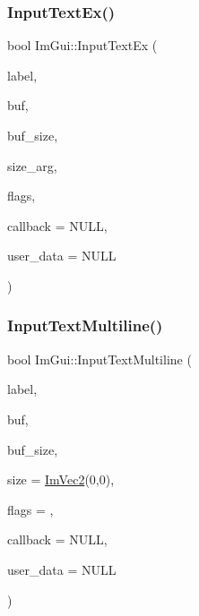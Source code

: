 \subsubsection{\texorpdfstring{Input\+Text\+Ex()}{InputTextEx()}}
{\footnotesize\ttfamily bool Im\+Gui\+::\+Input\+Text\+Ex (\begin{DoxyParamCaption}\item[{const char $\ast$}]{label,  }\item[{char $\ast$}]{buf,  }\item[{int}]{buf\+\_\+size,  }\item[{const \hyperlink{struct_im_vec2}{Im\+Vec2} \&}]{size\+\_\+arg,  }\item[{Im\+Gui\+Input\+Text\+Flags}]{flags,  }\item[{Im\+Gui\+Text\+Edit\+Callback}]{callback = {\ttfamily NULL},  }\item[{void $\ast$}]{user\+\_\+data = {\ttfamily NULL} }\end{DoxyParamCaption})}

\hypertarget{namespace_im_gui_a94b4d241eafa1a4a077f98f5aee00dda}{}\label{namespace_im_gui_a94b4d241eafa1a4a077f98f5aee00dda} 
\subsubsection{\texorpdfstring{Input\+Text\+Multiline()}{InputTextMultiline()}}
{\footnotesize\ttfamily bool Im\+Gui\+::\+Input\+Text\+Multiline (\begin{DoxyParamCaption}\item[{const char $\ast$}]{label,  }\item[{char $\ast$}]{buf,  }\item[{size\+\_\+t}]{buf\+\_\+size,  }\item[{const \hyperlink{struct_im_vec2}{Im\+Vec2} \&}]{size = {\ttfamily \hyperlink{struct_im_vec2}{Im\+Vec2}(0,0)},  }\item[{Im\+Gui\+Input\+Text\+Flags}]{flags = {},  }\item[{Im\+Gui\+Text\+Edit\+Callback}]{callback = {\ttfamily NULL},  }\item[{void $\ast$}]{user\+\_\+data = {\ttfamily NULL} }\end{DoxyParamCaption})}

\hypertarget{namespace_im_gui_a22668d440cbbb1f8be07241d9c6d9096}{}\label{namespace_im_gui_a22668d440cbbb1f8be07241d9c6d9096} 
